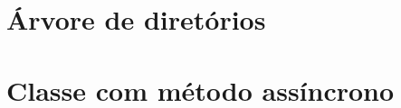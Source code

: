 \chapter{Árvore de diretórios \label{appendix_tree}}



\chapter{Classe com método assíncrono \label{appendix_proxy_example}}

